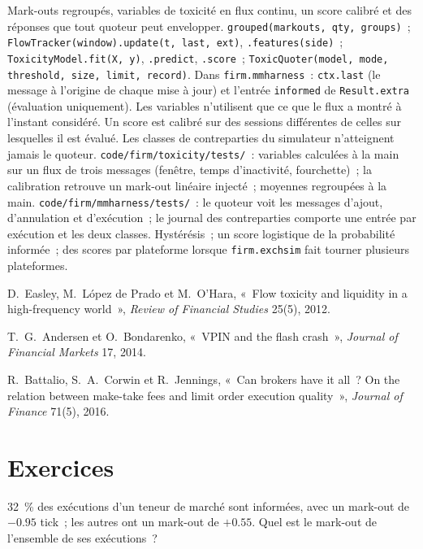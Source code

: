 \begin{build}
 Mark-outs regroupés, variables de toxicité en flux continu, un score calibré et des réponses que tout quoteur peut envelopper.
 \texttt{grouped(markouts, qty, groups)}~; \texttt{FlowTracker(window).update(t, last, ext)}, \texttt{.features(side)}~;
\texttt{ToxicityModel.fit(X, y)}, \texttt{.predict}, \texttt{.score}~; \texttt{ToxicQuoter(model, mode, threshold, size, limit, record)}. Dans
\texttt{firm.mmharness}~: \texttt{ctx.last} (le message à l'origine de chaque mise à jour) et l'entrée \texttt{informed} de \texttt{Result.extra} (évaluation uniquement).
 Les variables n'utilisent que ce que le flux a montré à l'instant considéré. Un score est calibré sur des sessions différentes de celles sur lesquelles il est évalué. Les
classes de contreparties du simulateur n'atteignent jamais le quoteur.
 \texttt{code/firm/toxicity/tests/}~: variables calculées à la main sur un flux de trois messages (fenêtre, temps d'inactivité, fourchette)~; la calibration
retrouve un mark-out linéaire injecté~; moyennes regroupées à la main. \texttt{code/firm/mmharness/tests/}~: le quoteur voit les messages d'ajout, d'annulation et d'exécution~;
le journal des contreparties comporte une entrée par exécution et les deux classes.
 Hystérésis~; un score logistique de la probabilité informée~; des scores par plateforme lorsque \texttt{firm.exchsim} fait tourner plusieurs plateformes.
\end{build}

\begin{omsources}
\item D.~Easley, M.~López de Prado et M.~O'Hara, «~Flow toxicity and liquidity in a high-frequency world~», \emph{Review of Financial Studies}
25(5), 2012.
\item T.~G.~Andersen et O.~Bondarenko, «~VPIN and the flash crash~», \emph{Journal of Financial Markets} 17, 2014.
\item R.~Battalio, S.~A.~Corwin et R.~Jennings, «~Can brokers have it all~? On the relation between make-take fees and limit order execution
quality~», \emph{Journal of Finance} 71(5), 2016.
\end{omsources}

\section{Exercices}

\begin{exercise}[$\star$]\label{exo:hf:adverse-selection-and-toxicity:1}
32~\% des exécutions d'un teneur de marché sont informées, avec un mark-out de $-0.95$ tick~; les autres ont un mark-out de $+0.55$. Quel est le mark-out de l'ensemble de ses exécutions~?
\end{exercise}

